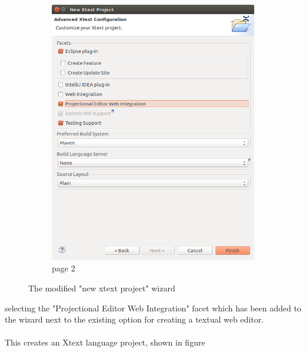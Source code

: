 \documentclass{article}
\begin{document}
\begin{figure}[t!]
\begin{subfigure}[b]{0.45\linewidth}
    \includegraphics[width=\linewidth]{./Screenshots/newXtextProjectPage2.png}
    \caption{page 2}
  \end{subfigure}
  \caption{The modified "new xtext project" wizard}
  \label{fig:newProjectWiz}
\end{figure}
selecting the "Projectional Editor Web Integration" facet which has been added to the wizard next to the existing option for creating a textual web editor.
\\
\\
This creates an Xtext language project, shown in figure
\end{document}
